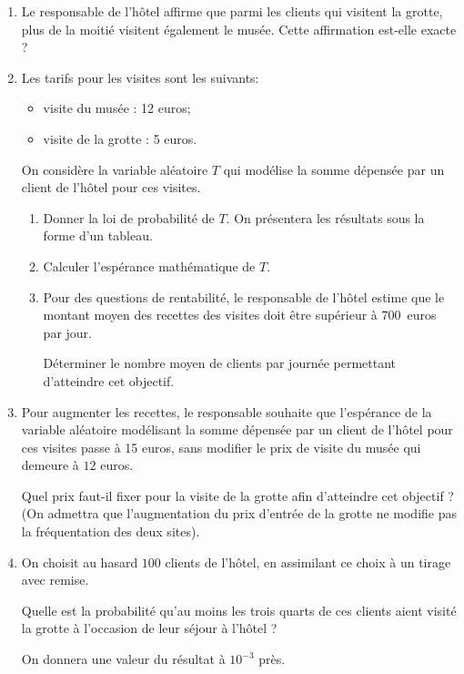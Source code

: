 \begin{enumerate}[resume,start=2]
\item Le responsable de l'hôtel affirme que parmi les clients qui visitent la grotte, plus de la moitié visitent également le musée. Cette affirmation est-elle exacte ?
\item Les tarifs pour les visites sont les suivants:

\begin{itemize}
\item[$\bullet~~$] visite du musée : 12 euros;
\item[$\bullet~~$] visite de la grotte : 5 euros.
\end{itemize}

On considère la variable aléatoire $T$ qui modélise la somme dépensée par un client de l'hôtel pour ces visites.
	\begin{enumerate}
		\item Donner la loi de probabilité de $T$. On présentera les résultats sous la forme d'un tableau.
		\item Calculer l'espérance mathématique de $T$.
		\item Pour des questions de rentabilité, le responsable de l'hôtel estime que le montant
moyen des recettes des visites doit être supérieur à $700$~euros par jour. 

Déterminer le nombre moyen de clients par journée permettant d'atteindre cet objectif.
	\end{enumerate}
\item Pour augmenter les recettes, le responsable souhaite que l'espérance de la variable aléatoire modélisant la somme dépensée par un client de l'hôtel pour ces visites passe à 15 euros, sans modifier le prix de visite du musée qui demeure à $12$ euros. 

Quel prix faut-il fixer pour la visite de la grotte afin d'atteindre cet objectif ? (On admettra que l'augmentation du prix d'entrée de la grotte ne modifie pas la fréquentation des deux sites).
\item On choisit au hasard $100$ clients de l'hôtel, en assimilant ce choix à un tirage avec remise.

Quelle est la probabilité qu'au moins les trois quarts de ces clients aient visité la grotte à l'occasion de leur séjour à l'hôtel ? 

On donnera une valeur du résultat à $10^{-3}$ près.
\end{enumerate}
